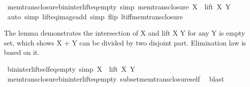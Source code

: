 \begin{isabellebody}
%
\isadelimproof
\isanewline
%
\endisadelimproof
\isanewline
{}\isamarkupfalse%
\ mem{\isacharunderscore}{\kern0pt}trans{\isacharunderscore}{\kern0pt}closure{\isacharunderscore}{\kern0pt}bin{\isacharunderscore}{\kern0pt}inter{\isacharunderscore}{\kern0pt}lift{\isacharunderscore}{\kern0pt}eq{\isacharunderscore}{\kern0pt}empty\ {\isacharbrackleft}{\kern0pt}simp{\isacharbrackright}{\kern0pt}{\isacharcolon}{\kern0pt}\ {\isachardoublequoteopen}mem{\isacharunderscore}{\kern0pt}trans{\isacharunderscore}{\kern0pt}closure\ X\ {\isasyminter}\ lift\ X\ Y\ {\isacharequal}{\kern0pt}\ {\isacharbraceleft}{\kern0pt}{\isacharbraceright}{\kern0pt}{\isachardoublequoteclose}\isanewline
%
\isadelimproof
\ \ %
\endisadelimproof
%
\isatagproof
{}\isamarkupfalse%
\ {\isacharparenleft}{\kern0pt}auto\ simp{\isacharcolon}{\kern0pt}\ lift{\isacharunderscore}{\kern0pt}eq{\isacharunderscore}{\kern0pt}image{\isacharunderscore}{\kern0pt}add\ simp\ flip{\isacharcolon}{\kern0pt}\ lt{\isacharunderscore}{\kern0pt}iff{\isacharunderscore}{\kern0pt}mem{\isacharunderscore}{\kern0pt}trans{\isacharunderscore}{\kern0pt}closure{\isacharparenright}{\kern0pt}%
\endisatagproof
{\isafoldproof}%
%
\isadelimproof
%
\endisadelimproof
%
\begin{isamarkuptext}%
The lemma demonstrates the intersection of X and lift X Y for any Y is empty set, 
which shows X + Y can be divided by two disjoint part.
Elimination law is based on it.%
\end{isamarkuptext}\isamarkuptrue%
\isamarkupfalse%
\ bin{\isacharunderscore}{\kern0pt}inter{\isacharunderscore}{\kern0pt}lift{\isacharunderscore}{\kern0pt}self{\isacharunderscore}{\kern0pt}eq{\isacharunderscore}{\kern0pt}empty\ {\isacharbrackleft}{\kern0pt}simp{\isacharbrackright}{\kern0pt}{\isacharcolon}{\kern0pt}\ {\isachardoublequoteopen}X\ {\isasyminter}\ lift\ X\ Y\ {\isacharequal}{\kern0pt}\ {\isacharbraceleft}{\kern0pt}{\isacharbraceright}{\kern0pt}{\isachardoublequoteclose}\isanewline
%
\isadelimproof
\ \ %
\endisadelimproof
%
\isatagproof
{}\isamarkupfalse%
\ mem{\isacharunderscore}{\kern0pt}trans{\isacharunderscore}{\kern0pt}closure{\isacharunderscore}{\kern0pt}bin{\isacharunderscore}{\kern0pt}inter{\isacharunderscore}{\kern0pt}lift{\isacharunderscore}{\kern0pt}eq{\isacharunderscore}{\kern0pt}empty\ subset{\isacharunderscore}{\kern0pt}mem{\isacharunderscore}{\kern0pt}trans{\isacharunderscore}{\kern0pt}closure{\isacharunderscore}{\kern0pt}self\ \isamarkupfalse%
\ blast%
\endisatagproof
{\isafoldproof}%
%
\isadelimproof

\end{isabellebody}
